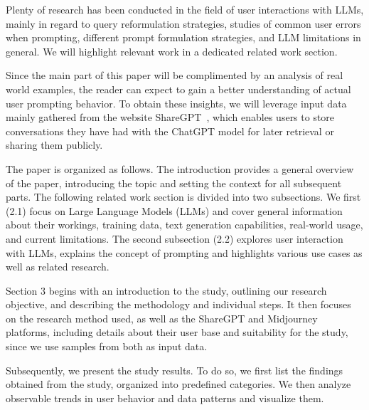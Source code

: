 Plenty of research has been conducted in the field of user interactions with LLMs, mainly in
regard to query reformulation strategies, studies of common user errors when prompting,
different prompt formulation strategies, and LLM limitations in general.
We will highlight relevant work in a dedicated related work section. %

Since the main part of this paper will be complimented by an analysis of real world examples, the
reader can expect to gain a better understanding of actual user prompting behavior.
To obtain these insights, we will leverage input data mainly gathered from the website
ShareGPT~\cite{sharegpt_sharegpt_2023}, %
which enables users to store conversations they have had with the ChatGPT model for later retrieval
or sharing them publicly.


The paper is organized as follows.
The introduction provides a general overview of the paper, introducing the topic and setting the context for all
subsequent parts.
The following related work section is divided into two subsections.
We first (2.1) focus on Large Language Models (LLMs) and cover general information about their
workings, training data, text generation capabilities, real-world usage, and current limitations.
The second subsection (2.2) explores user interaction with LLMs, explains the concept of
prompting and highlights various use cases as well as related research.

Section 3 begins with an introduction to the study, outlining our research objective, and
describing the methodology and individual steps.
It then focuses on the research method used, as well as the ShareGPT and Midjourney platforms,
including details about their user base and suitability for the study, since we use
samples from both as input data.

Subsequently, we present the study results.
To do so, we first list the findings obtained from the study, organized into predefined categories.
We then analyze observable trends in user behavior and data patterns and visualize them.

